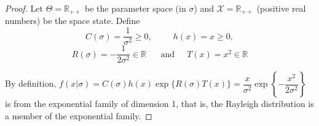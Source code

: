 \begin{proof}
    Let $\Theta = \mathbb{R}_{++}$ be the parameter space (in $\sigma$) and $\mathcal{X} =
    \mathbb{R}_{++}$ (positive real numbers) be the space state. Define 
    $$C(\sigma) = \frac{1}{\sigma^2} \ge 0, ~~~~~~~~~~~h(x) = x \ge 0,$$
    $$R(\sigma) = -\frac{1}{2\sigma^2} \in \mathbb{R} ~~~~~~ \text{ and } ~~~~~T(x) = x^2 \in \mathbb{R}$$

    By definition, $f(x|\sigma) = C(\sigma)h(x)\exp\{R(\sigma)T(x)\} =
    \dfrac{x}{\sigma^2}\exp\left\{-\dfrac{x^2}{2\sigma^2}\right\}$ is from the
    exponential family of dimension 1, that is, the Rayleigh distribution is a
    member of the exponential family. 
\end{proof}